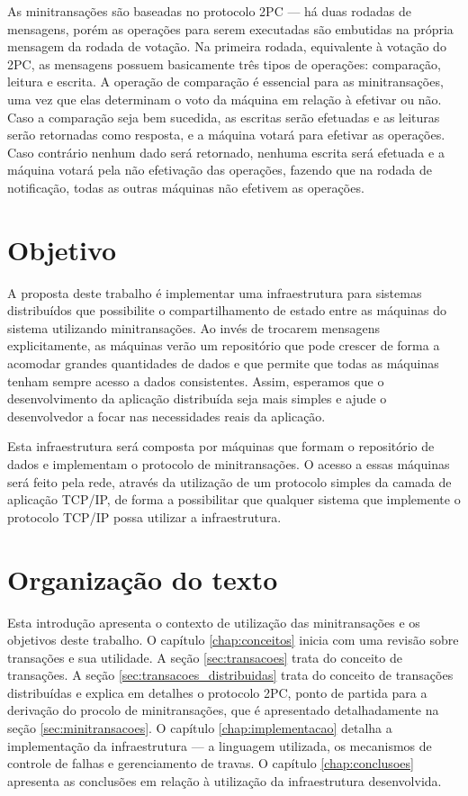 \documentclass[11pt,twoside,a4paper]{book}
\begin{document}
As minitransações são baseadas no protocolo 2PC --- há duas rodadas de mensagens, porém as operações para serem executadas são embutidas na própria mensagem da rodada de votação. Na primeira rodada, equivalente à votação do 2PC, as mensagens possuem basicamente três tipos de operações: comparação, leitura e escrita. A operação de comparação é essencial para as minitransações, uma vez que elas determinam o voto da máquina em relação à efetivar ou não. Caso a comparação seja bem sucedida, as escritas serão efetuadas e as leituras serão retornadas como resposta, e a máquina votará para efetivar as operações. Caso contrário nenhum dado será retornado, nenhuma escrita será efetuada e a máquina votará pela não efetivação das operações, fazendo que na rodada de notificação, todas as outras máquinas não efetivem as operações.

\section{Objetivo}
\label{sec:objetivo}
A proposta deste trabalho é implementar uma infraestrutura para sistemas distribuídos que possibilite o compartilhamento de estado entre as máquinas do sistema utilizando minitransações. Ao invés de trocarem mensagens explicitamente, as máquinas verão um repositório que pode crescer de forma a acomodar grandes quantidades de dados e que permite que todas as máquinas tenham sempre acesso a dados consistentes. Assim, esperamos que o desenvolvimento da aplicação distribuída seja mais simples e ajude o desenvolvedor a focar nas necessidades reais da aplicação.

Esta infraestrutura será composta por máquinas que formam o repositório de dados e implementam o protocolo de minitransações. O acesso a essas máquinas será feito pela rede, através da utilização de um protocolo simples da camada de aplicação TCP/IP, de forma a possibilitar que qualquer sistema que implemente o protocolo TCP/IP possa utilizar a infraestrutura.

\section{Organização do texto}
\label{sec:organizacao_do_texto}
Esta introdução apresenta o contexto de utilização das minitransações e os objetivos deste trabalho. O capítulo \ref{chap:conceitos} inicia com uma revisão sobre transações e sua utilidade. A seção \ref{sec:transacoes} trata do conceito de transações. A seção \ref{sec:transacoes_distribuidas} trata do conceito de transações distribuídas e explica em detalhes o protocolo 2PC, ponto de partida para a derivação do procolo de minitransações, que é apresentado detalhadamente na seção \ref{sec:minitransacoes}. O capítulo \ref{chap:implementacao} detalha a implementação da infraestrutura --- a linguagem utilizada, os mecanismos de controle de falhas e gerenciamento de travas. O capítulo \ref{chap:conclusoes} apresenta as conclusões em relação à utilização da infraestrutura desenvolvida.
\end{document}
